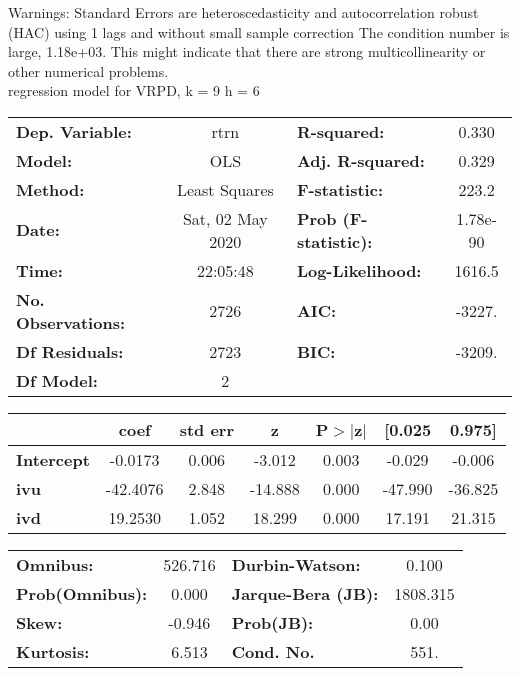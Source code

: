 Warnings: \newline
 [1] Standard Errors are heteroscedasticity and autocorrelation robust (HAC) using 1 lags and without small sample correction \newline
 [2] The condition number is large, 1.18e+03. This might indicate that there are \newline
 strong multicollinearity or other numerical problems.\\ 

regression model for VRPD, k = 9 h = 6\begin{center}
\begin{tabular}{lclc}
\toprule
\textbf{Dep. Variable:}    &       rtrn       & \textbf{  R-squared:         } &     0.330   \\
\textbf{Model:}            &       OLS        & \textbf{  Adj. R-squared:    } &     0.329   \\
\textbf{Method:}           &  Least Squares   & \textbf{  F-statistic:       } &     223.2   \\
\textbf{Date:}             & Sat, 02 May 2020 & \textbf{  Prob (F-statistic):} &  1.78e-90   \\
\textbf{Time:}             &     22:05:48     & \textbf{  Log-Likelihood:    } &    1616.5   \\
\textbf{No. Observations:} &        2726      & \textbf{  AIC:               } &    -3227.   \\
\textbf{Df Residuals:}     &        2723      & \textbf{  BIC:               } &    -3209.   \\
\textbf{Df Model:}         &           2      & \textbf{                     } &             \\
\bottomrule
\end{tabular}
\begin{tabular}{lcccccc}
                   & \textbf{coef} & \textbf{std err} & \textbf{z} & \textbf{P$> |$z$|$} & \textbf{[0.025} & \textbf{0.975]}  \\
\midrule
\textbf{Intercept} &      -0.0173  &        0.006     &    -3.012  &         0.003        &       -0.029    &       -0.006     \\
\textbf{ivu}       &     -42.4076  &        2.848     &   -14.888  &         0.000        &      -47.990    &      -36.825     \\
\textbf{ivd}       &      19.2530  &        1.052     &    18.299  &         0.000        &       17.191    &       21.315     \\
\bottomrule
\end{tabular}
\begin{tabular}{lclc}
\textbf{Omnibus:}       & 526.716 & \textbf{  Durbin-Watson:     } &    0.100  \\
\textbf{Prob(Omnibus):} &   0.000 & \textbf{  Jarque-Bera (JB):  } & 1808.315  \\
\textbf{Skew:}          &  -0.946 & \textbf{  Prob(JB):          } &     0.00  \\
\textbf{Kurtosis:}      &   6.513 & \textbf{  Cond. No.          } &     551.  \\
\bottomrule
\end{tabular}
\end{center}

